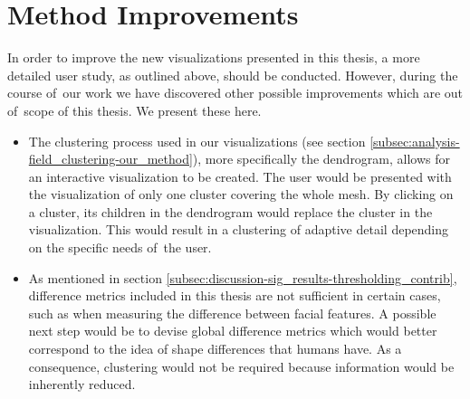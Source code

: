 \section{Method Improvements}
\label{sec:discussion-method_improvements}

In order to improve the new visualizations presented in this thesis, a more detailed user study, as outlined above, should be conducted. However, during the course of~our work we have discovered other possible improvements which are out of~scope of this thesis. We present these here.

\begin{itemize}
	\item The clustering process used in our visualizations (see section \ref{subsec:analysis-field_clustering-our_method}), more specifically the dendrogram, allows for an interactive visualization to be created. The user would be presented with the visualization of only one cluster covering the whole mesh. By clicking on a cluster, its children in the dendrogram would replace the cluster in the visualization. This would result in a clustering of adaptive detail depending on the specific needs of~the user.
	\item As mentioned in section \ref{subsec:discussion-sig_results-thresholding_contrib}, difference metrics included in this thesis are not sufficient in certain cases, such as when measuring the difference between facial features. A possible next step would be to devise global difference metrics which would better correspond to the idea of shape differences that humans have. As a consequence, clustering would not be required because information would be inherently reduced.
\end{itemize}
